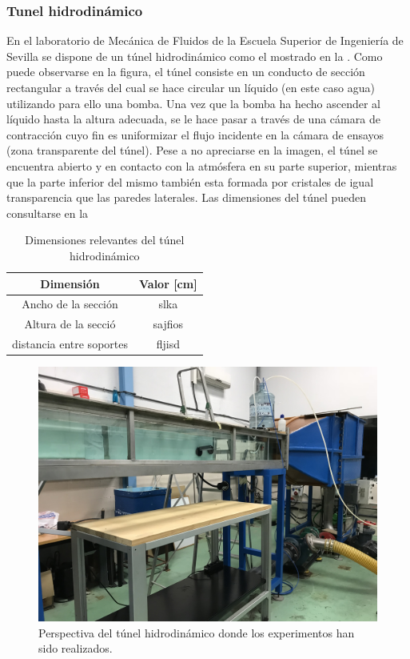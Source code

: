 \subsubsection*{Tunel hidrodinámico}

En el laboratorio de Mecánica de Fluidos de la Escuela Superior de Ingeniería de Sevilla se dispone de un túnel hidrodinámico como el mostrado en la . Como puede observarse en la figura, el túnel consiste en un conducto de sección rectangular a través del cual se hace circular un líquido (en este caso agua) utilizando para ello una bomba. Una vez que la bomba ha hecho ascender al líquido hasta la altura adecuada, se le hace pasar a través de una cámara de contracción cuyo fin es uniformizar el flujo incidente en la cámara de ensayos (zona transparente del túnel). Pese a no apreciarse en la imagen, el túnel se encuentra abierto  y en contacto con la atmósfera en su parte superior, mientras que la parte inferior del mismo también esta formada por cristales de igual transparencia que las paredes laterales. Las dimensiones del túnel pueden consultarse en la 

\begin{table}
\begin{tabular}{c c}
\textbf{Dimensión} & Valor [cm] \\
\hline \hline
Ancho de la sección & slka  \\
Altura de la secció & sajfios \\
distancia entre soportes & fljisd \\
\hline
\end{tabular}
\caption{Dimensiones relevantes del túnel hidrodinámico}
\end{table}

\begin{figure}
\includegraphics[scale=0.1]{ala2D/figuras/tunel.jpg}
\caption{Perspectiva del túnel hidrodinámico donde los experimentos han sido realizados.}
\end{figure}


